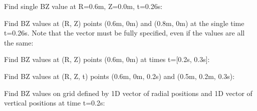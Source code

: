 \documentclass[letterpaper,10pt,english]{sphinxmanual}
\begin{document}
\begin{fulllineitems}
\begin{fulllineitems}
Find single BZ value at R=0.6m, Z=0.0m, t=0.26s:

\begin{sphinxVerbatim}[commandchars=\\\{\}]
    
\end{sphinxVerbatim}

Find BZ values at (R, Z) points (0.6m, 0m) and (0.8m, 0m) at the
single time t=0.26s. Note that the  vector must be fully
specified, even if the values are all the same:

\begin{sphinxVerbatim}[commandchars=\\\{\}]
  \PYG{p}{[} \PYG{p}{]} \PYG{p}{[} \PYG{p}{]} 
\end{sphinxVerbatim}

Find BZ values at (R, Z) points (0.6m, 0m) at times t={[}0.2s, 0.3s{]}:

\begin{sphinxVerbatim}[commandchars=\\\{\}]
    \PYG{p}{[} \PYG{p}{]}
\end{sphinxVerbatim}

Find BZ values at (R, Z, t) points (0.6m, 0m, 0.2s) and
(0.5m, 0.2m, 0.3s):

\begin{sphinxVerbatim}[commandchars=\\\{\}]
  \PYG{p}{[} \PYG{p}{]} \PYG{p}{[} \PYG{p}{]} \PYG{p}{[} \PYG{p}{]} 
\end{sphinxVerbatim}

Find BZ values on grid defined by 1D vector of radial positions 
and 1D vector of vertical positions  at time t=0.2s:


\end{fulllineitems}
\end{fulllineitems}
\end{document}
